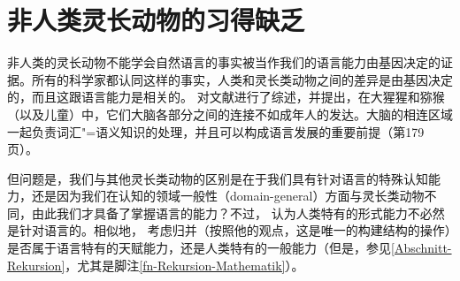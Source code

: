 \section{非人类灵长动物的习得缺乏}

非人类的灵长动物不能学会自然语言的事实被当作我们的语言能力由基因决定的证据。所有的科学家都认同这样的事实，人类和灵长类动物之间的差异是由基因决定的，而且这跟语言能力是相关的。
 \citet{Friederici2009a}对文献进行了综述，并提出，在大猩猩和猕猴（以及儿童）中，它们大脑各部分之间的连接不如成年人的发达。大脑的相连区域一起负责词汇"=语义知识的处理，并且可以构成语言发展的重要前提（第179页）。

但问题是，我们与其他灵长类动物的区别是在于我们具有针对语言的特殊认知能力，还是因为我们在认知的领域一般性（domain-general）方面与灵长类动物不同，由此我们才具备了掌握语言的能力？不过， \citet[\S~2]{Fanselow92b}认为人类特有的形式能力不必然是针对语言的。相似地， \citet[--8]{Chomsky2007a}考虑归并（按照他的观点，这是唯一的构建结构的操作）是否属于语言特有的天赋能力，还是人类特有的一般能力（但是，参见\ref{Abschnitt-Rekursion}，尤其是脚注\ref{fn-Rekursion-Mathematik}）。

